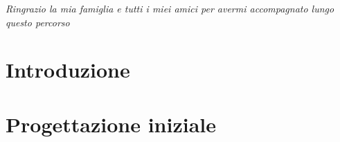 \documentclass[12pt,a4paper]{book}
\newcommand{\intentblankpage}{
    \newpage
    \null
    \vfill
    \thispagestyle{empty}
    \newpage
}
\newlength{\sixtyfivecharwidth}
\begin{document}
    
    \intentblankpage
    
    \vspace*{50mm}
        
    \vspace*{50mm}
    \begin{flushright}
        \textit{\large Ringrazio la mia famiglia e tutti i miei amici per avermi accompagnato lungo questo percorso}
    \end{flushright}
    
    \newpage
    
    
    
    
    \tableofcontents
    
    \chapter*{Introduzione}
    
    
    \chapter{Progettazione iniziale}
    \label{CH:1}
    
    
\end{document}
